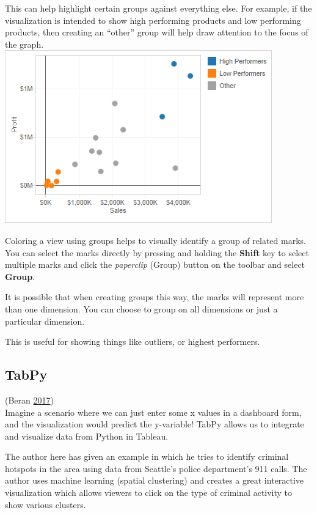 \documentclass[]{book}
\begin{document}
This can help highlight certain groups against everything else. For example, if the visualization is intended to show high performing products and low performing products, then creating an ``other'' group will help draw attention to the focus of the graph.
\includegraphics{images/ad-hoc24.png}

Coloring a view using groups helps to visually identify a group of related marks. You can select the marks directly by pressing and holding the \textbf{Shift} key to select multiple marks and click the \emph{paperclip} (Group) button on the toolbar and select \textbf{Group}.

It is possible that when creating groups this way, the marks will represent more than one dimension. You can choose to group on all dimensions or just a particular dimension.

This is useful for showing things like outliers, or highest performers.

\hypertarget{tabpy}{%
\subsection{TabPy}\label{tabpy}}

(Beran \protect\hyperlink{ref-TabPy}{2017})\\
Imagine a scenario where we can just enter some x values in a dashboard form, and the visualization would predict the y-variable! TabPy allows us to integrate and visualize data from Python in Tableau.

The author here has given an example in which he tries to identify criminal hotspots in the area using data from Seattle's police department's 911 calls. The author uses machine learning (spatial clustering) and creates a great interactive visualization which allows viewers to click on the type of criminal activity to show various clusters.
\end{document}
